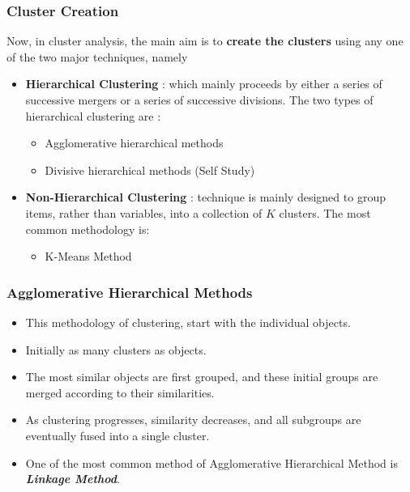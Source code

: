 \documentclass[10pt]{beamer} %
\begin{document}
\begin{frame}
   \frametitle{Cluster Creation}
   Now, in cluster analysis, the main aim is to \textbf{create the clusters}
   using any one of the two major techniques, namely
   \vspace{0.5cm}
   \begin{itemize}
      \item \textbf{Hierarchical Clustering} : which mainly  proceeds by either
         a series of successive mergers or a series of successive divisions. The
         two types of hierarchical clustering are :
         \begin{itemize}
            \item Agglomerative hierarchical methods
            \item Divisive hierarchical methods (Self Study)
         \end{itemize}
         \vspace{0.75cm}
      \item \textbf{Non-Hierarchical Clustering} : technique is mainly designed
         to group items, rather than variables, into a collection of $K$
         clusters. The most common methodology is:
         \begin{itemize}
            \item K-Means Method
         \end{itemize}
   \end{itemize}
\end{frame}

\begin{frame}
   \frametitle{Agglomerative Hierarchical Methods}
   \begin{itemize}
      \item This methodology of clustering, start with the individual objects.
         \vspace{0.5cm}
      \item Initially as many clusters as objects.
         \vspace{0.5cm}
      \item The most similar objects are first grouped, and these initial groups
         are merged according to their similarities.
         \vspace{0.5cm}
      \item As clustering progresses, similarity decreases, and all subgroups
         are eventually fused into a single cluster.
         \vspace{0.5cm}
      \item One of the most common method of Agglomerative Hierarchical Method
         is \textbf{\textit{Linkage Method}}.
   \end{itemize}
\end{frame}
\end{document}
